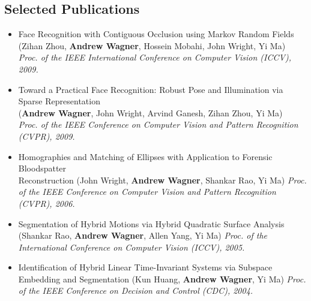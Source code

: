 \documentclass[line]{res}
\def\spaceline{\vspace{1mm} \fullline}
\begin{document}
\begin{resume}
 \section{Selected Publications}
 \begin{itemize}
 \item 
 \spaceline
Face Recognition with Contiguous Occlusion using Markov Random Fields \\
(Zihan Zhou, {\bf Andrew Wagner}, Hossein Mobahi, John Wright, Yi Ma) \\
{\it Proc. of the IEEE International Conference on Computer Vision (ICCV), 2009.}
\item Toward a Practical Face Recognition: Robust Pose and Illumination via Sparse Representation \\
({\bf Andrew Wagner}, John Wright, Arvind Ganesh, Zihan Zhou, Yi Ma) \\
{ \it Proc. of the IEEE Conference on Computer Vision and Pattern Recognition (CVPR), 2009. }
\item Homographies and Matching of Ellipses with Application to Forensic Bloodspatter \\
Reconstruction 
(John Wright, {\bf Andrew Wagner}, {Shankar Rao},  Yi Ma) 
{\it Proc. of the IEEE Conference on Computer Vision and Pattern Recognition (CVPR), 2006.}
\item Segmentation of Hybrid Motions via Hybrid Quadratic Surface Analysis ({Shankar Rao}, {\bf Andrew Wagner}, Allen Yang, Yi Ma) {\it Proc. of the International Conference on Computer Vision (ICCV), 2005.}
\item Identification of Hybrid Linear Time-Invariant Systems via Subspace Embedding and Segmentation (Kun Huang, {\bf Andrew Wagner}, Yi Ma) {\it Proc. of the IEEE Conference on Decision and Control (CDC), 2004.}


\end{itemize}
\end{resume}
\end{document}
